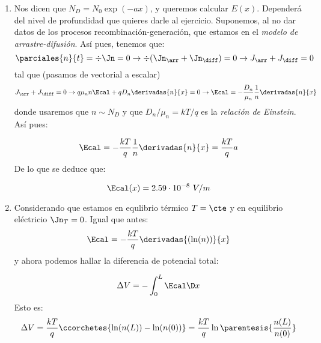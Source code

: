 	\begin{enumerate}[label=\alph*)]
		\item Nos dicen que $N_D=N_0 \exp(-ax)$, y queremos calcular $E(x)$. Dependerá del nivel de profundidad que quieres darle al ejercicio. Suponemos, al no dar datos de los procesos recombinación-generación, que estamos en el \textit{modelo de arrastre-difusión}. Así pues, tenemos que:
		\begin{equation}
			\parciales{n}{t} = \div \Jn = 0 \rightarrow \div (\Jn_{\arr}+\Jn_{\diff}) = 0 \rightarrow J_{\arr}+J_{\diff} = 0
		\end{equation}
		tal que (pasamos de vectorial a escalar)
		\begin{equation}
			J_{\arr}+J_{\diff} = 0 \rightarrow q \mu_n n \Ecal + q D_n \derivadas{n}{x} = 0 \rightarrow \Ecal = - \frac{D_n}{\mu_n} \frac{1}{n} \derivadas{n}{x}
		\end{equation}
		donde usaremos que $n\sim N_D$ y que $D_n / \mu_n = kT/q$ es la \textit{relación de Einstein}. Así pues:

		\begin{equation}
			\Ecal = - \frac{kT}{q} \frac{1}{n} \derivadas{n}{x} = \frac{kT}{q} a
		\end{equation}
		De lo que se deduce que:

		\begin{equation}
			\Ecal(x) = 2.59 \cdot 10^{-8} \ V/m
		\end{equation}
		\item Considerando que estamos en equlibrio térmico $T=\cte$ y en equilibrio eléctricio $\Jn_T=0$. Igual que antes:
		\begin{equation}
			\Ecal = - \frac{kT}{q} \derivadas{(\ln(n))}{x}
		\end{equation}
		y ahora podemos hallar la diferencia de potencial total:

		\begin{equation}
			\Delta V = - \int_{0}^L \Ecal \D x
		\end{equation}
		Esto es:
		\begin{equation}
			\Delta V = \frac{kT}{q} \ccorchetes{\ln(n(L))-\ln(n(0))} = \frac{kT}{q} \ln\parentesis{\frac{n(L)}{n(0)}}
		\end{equation}
	\end{enumerate}
